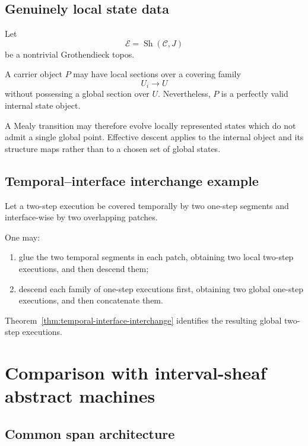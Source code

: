 \subsection{Genuinely local state data}
\label{subsec:example-genuinely-local-state-data}

Let
\[
    \mathcal E=\operatorname{Sh}(\mathcal C,J)
\]
be a nontrivial Grothendieck topos.

A carrier object \(P\) may have local sections over a covering family
\[
    U_i\to U
\]
without possessing a global section over \(U\). Nevertheless, \(P\) is a
perfectly valid internal state object.

A Mealy transition may therefore evolve locally represented states which do
not admit a single global point. Effective descent applies to the internal
object and its structure maps rather than to a chosen set of global states.

\subsection{Temporal--interface interchange example}
\label{subsec:example-temporal-interface-interchange}

Let a two-step execution be covered temporally by two one-step segments and
interface-wise by two overlapping patches.

One may:
\begin{enumerate}
    \item glue the two temporal segments in each patch, obtaining two local
    two-step executions, and then descend them;
    \item descend each family of one-step executions first, obtaining two
    global one-step executions, and then concatenate them.
\end{enumerate}

Theorem~\ref{thm:temporal-interface-interchange} identifies the resulting
global two-step executions.

\section{Comparison with interval-sheaf abstract machines}
\label{sec:comparison-interval-sheaf-machines}

\subsection{Common span architecture}
\label{subsec:common-span-architecture}

